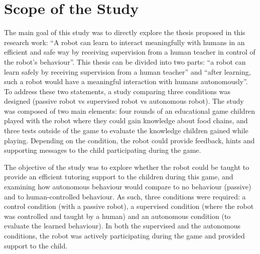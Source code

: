 \section{Scope of the Study} \label{sec:tutoring_scope}

The main goal of this study was to directly explore the thesis proposed in this research work: ``A robot can learn to interact meaningfully with humans in an efficient and safe way by receiving supervision from a human teacher in control of the robot's behaviour''. This thesis can be divided into two parts: ``a robot can learn safely by receiving supervision from a human teacher'' and ``after learning, such a robot would have a meaningful interaction with humans autonomously''. To address these two statements, a study comparing three conditions was designed (passive robot vs supervised robot vs autonomous robot). The study was composed of two main elements: four rounds of an educational game children played with the robot where they could gain knowledge about food chains, and three tests outside of the game to evaluate the knowledge children gained while playing. Depending on the condition, the robot could provide feedback, hints and supporting messages to the child participating during the game. 

The objective of the study was to explore whether the robot could be taught to provide an efficient tutoring support to the children during this game, 
and examining how autonomous behaviour would compare to no behaviour (passive) and to human-controlled behaviour. As such, three conditions were required: a control condition (with a passive robot), a supervised condition (where the robot was controlled and taught by a human) and an autonomous condition (to evaluate the learned behaviour). In both the supervised and the autonomous conditions, the robot was actively participating during the game and provided support to the child.

